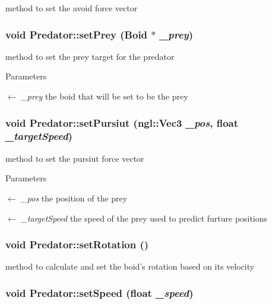 method to set the avoid force vector \hypertarget{classPredator_a076ed210d3facc11144e4d4d02d916cb}{
\subsubsection[{setPrey}]{\setlength{\rightskip}{0pt plus 5cm}void Predator::setPrey ({\bf Boid} $\ast$ {\em \_\-prey})}}
\label{classPredator_a076ed210d3facc11144e4d4d02d916cb}


method to set the prey target for the predator 
\begin{DoxyParams}{Parameters}
\item[\mbox{$\leftarrow$} {\em \_\-prey}]the boid that will be set to be the prey \end{DoxyParams}
\hypertarget{classPredator_a2e5d5f04490a8c579c1fc7e4b9886828}{
\subsubsection[{setPursiut}]{\setlength{\rightskip}{0pt plus 5cm}void Predator::setPursiut (ngl::Vec3 {\em \_\-pos}, \/  float {\em \_\-targetSpeed})}}
\label{classPredator_a2e5d5f04490a8c579c1fc7e4b9886828}


method to set the pursiut force vector 
\begin{DoxyParams}{Parameters}
\item[\mbox{$\leftarrow$} {\em \_\-pos}]the position of the prey \item[\mbox{$\leftarrow$} {\em \_\-targetSpeed}]the speed of the prey used to predict furture positions \end{DoxyParams}
\hypertarget{classPredator_a89c3ac6389663d791050734cd3a62e32}{
\subsubsection[{setRotation}]{\setlength{\rightskip}{0pt plus 5cm}void Predator::setRotation ()}}
\label{classPredator_a89c3ac6389663d791050734cd3a62e32}


method to calculate and set the boid's rotation based on its velocity \hypertarget{classPredator_a2383f6147e78a4b6f632144466758fbb}{
\subsubsection[{setSpeed}]{\setlength{\rightskip}{0pt plus 5cm}void Predator::setSpeed (float {\em \_\-speed})}}
\label{classPredator_a2383f6147e78a4b6f632144466758fbb}


